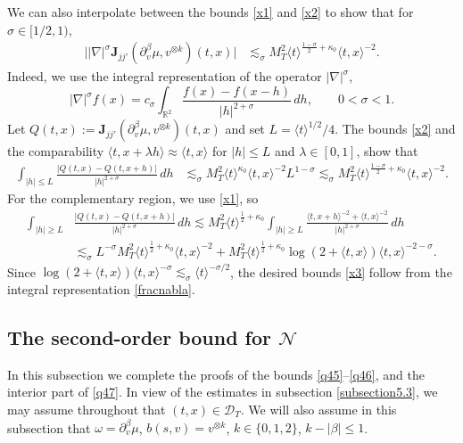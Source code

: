 \documentclass[reqno,11pt]{amsart}
\numberwithin{equation}{section}
\begin{document}
We can also interpolate between the bounds \eqref{x1} and \eqref{x2} to show that for $\sigma\in[1/2,1)$,
\begin{align}
\big||\nabla|^\sigma\mathbf J_{jj'}(\partial_v^\beta\mu,v^{\otimes k})(t,x)\big|
&\lesssim_\sigma M_T^2\langle t\rangle^{\frac{1-\sigma}{2}+\kappa_0}
\langle t,x\rangle^{-2}.
\label{x3}
\end{align}
Indeed, we use the integral representation of the operator $|\nabla|^\sigma$,
\begin{equation}\label{fracnabla}
|\nabla|^\sigma f(x)=c_\sigma 
\int_{\mathbb R^2}\frac{f(x)-f(x-h)}{|h|^{2+\sigma}}\,dh,\qquad 0<\sigma<1.
\end{equation}
Let $Q(t,x):=\mathbf J_{jj'}(\partial_v^\beta\mu,v^{\otimes k})(t,x)$ and set
$L=\langle t\rangle^{1/2}/4$. The bounds \eqref{x2} and the comparability
$\langle t,x+\lambda h\rangle\approx\langle t,x\rangle$ for $|h|\leq L$ and $\lambda\in[0,1]$, show that
\begin{align*}
\int_{|h|\leq L}\frac{|Q(t,x)-Q(t,x+h)|}{|h|^{2+\sigma}}\,dh
&\lesssim_\sigma M_T^2\langle t\rangle^{\kappa_0}\langle t,x\rangle^{-2}L^{1-\sigma}\lesssim_\sigma
M_T^2\langle t\rangle^{\frac{1-\sigma}{2}+\kappa_0}\langle t,x\rangle^{-2}.
\end{align*}
For the complementary region, we use \eqref{x1}, so
\begin{equation*}
\begin{split}
\int_{|h|\geq L}&\frac{|Q(t,x)-Q(t,x+h)|}{|h|^{2+\sigma}}\,dh\lesssim M_T^2\langle t\rangle^{\frac12+\kappa_0}\int_{|h|\geq L}
\frac{\langle t,x+h\rangle^{-2}+\langle t,x\rangle^{-2}}{|h|^{2+\sigma}}\,dh\\
&\lesssim_\sigma L^{-\sigma}M_T^2\langle t\rangle^{\frac12+\kappa_0}\langle t,x\rangle^{-2}
+M_T^2\langle t\rangle^{\frac12+\kappa_0}\log(2+\langle t,x\rangle)\langle t,x\rangle^{-2-\sigma}.
\end{split}
\end{equation*}
Since
$\log(2+\langle t,x\rangle)\langle t,x\rangle^{-\sigma}
\lesssim_\sigma\langle t\rangle^{-\sigma/2}$,
the desired bounds \eqref{x3} follow from the integral representation \eqref{fracnabla}.
	
\subsection{The second-order bound for $\mathcal N$}\label{secondorderbound}

In this subsection we complete the proofs of the bounds \eqref{q45}--\eqref{q46}, and the
interior part of \eqref{q47}. In view of the estimates in subsection
\ref{subsection5.3}, we may assume throughout that $(t,x)\in\mathcal D_T$. We will also assume in this subsection that $\omega=\partial_v^\beta\mu$, $b(s,v)=v^{\otimes k}$, $k\in\{0,1,2\}$, $k-|\beta|\leq1$. 
\end{document}
